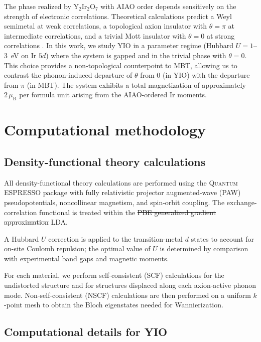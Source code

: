 \documentclass[galley,aps,pra,10pt,amsmath,amssymb,
    superscriptaddress,nofootinbib,longbibliography]{revtex4-2}
\def\Red#1{\textcolor{red}{#1}}
\newcounter{comm}
\newcommand{\seclab}[1]{\label{sec:#1}{\Red{\small\;\;[sec:~#1]}}}
\newcommand{\seclab}[1]{\label{sec:#1}}
\newcommand{\code}[1]{\textsc{#1}}
\begin{document}
The phase realized by Y$_2$Ir$_2$O$_7$ with AIAO order depends sensitively on the strength of electronic correlations.
Theoretical calculations predict a Weyl semimetal at weak correlations, a topological axion insulator with $\theta = \pi$ at intermediate correlations, and a trivial Mott insulator with $\theta = 0$ at strong correlations \cite{wan2011topological, witczak2014correlated}. In this work, we study YIO in a parameter regime (Hubbard $U = 1$--$3$~eV on Ir $5d$) where the system is gapped and in the trivial phase with $\theta = 0$.
This choice provides a non-topological counterpoint to MBT, allowing us to contrast the phonon-induced departure of $\theta$ from $0$ (in YIO) with the departure from $\pi$ (in MBT).
The system exhibits a total magnetization of approximately $2\,\mu_\text{B}$ per formula unit arising from the AIAO-ordered Ir moments.




\section{Computational methodology}
\seclab{methods}


\subsection{Density-functional theory calculations}

All density-functional theory calculations are performed using the \code{Quantum ESPRESSO} package with fully relativistic projector augmented-wave (PAW) pseudopotentials, noncollinear magnetism, and spin-orbit coupling.
The exchange-correlation functional is treated within the \st{PBE generalized gradient approximation} LDA.

A Hubbard $U$ correction is applied to the transition-metal $d$ states to account for on-site Coulomb repulsion; the optimal value of $U$ is determined by comparison with experimental band gaps and magnetic moments.

For each material, we perform self-consistent (SCF) calculations for the undistorted structure and for structures displaced along each axion-active phonon mode.
Non-self-consistent (NSCF) calculations are then performed on a uniform $k$-point mesh to obtain the Bloch eigenstates needed for Wannierization.


\subsection{Computational details for YIO}
\end{document}
